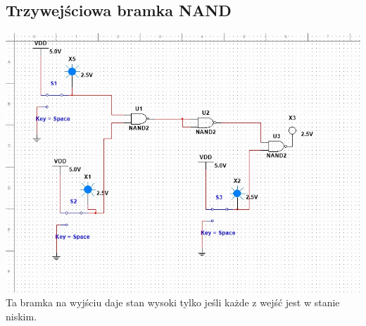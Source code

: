 \documentclass[12pt,a4paper]{article}
\begin{document}
\subsection{Trzywejściowa bramka NAND}
\includegraphics[width=\textwidth]{NAND3}
Ta bramka na wyjściu daje stan wysoki tylko jeśli każde z wejść jest w stanie niskim.
\end{document}

